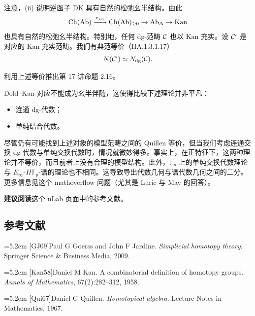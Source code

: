 \nitem\label{L18-B.2} 注意，(ii) 说明逆函子 $\mathrm{DK}$ 具有自然的松弛幺半结构。由此
\[
\operatorname{Ch}(\operatorname{Ab})\xrightarrow{\tau_{\ge 0}}\operatorname{Ch}(\operatorname{Ab})_{\ge 0}\to\operatorname{Ab}_{\Delta}\to\operatorname{Kan}
\]
也具有自然的松弛幺半结构。特别地，任何 dg-范畴 $\mathcal{C}$ 也以 Kan 充实。设 $\mathcal{C}'$ 是对应的 Kan 充实范畴。我们有典范等价（HA.1.3.1.17）
\[
N(\mathcal{C}')\simeq N_{\mathrm{dg}}(\mathcal{C}).
\]

\begin{exercise}\label{L18-B.3}
利用上述等价推出第 17 讲命题 2.16。
\end{exercise}

\nitem\label{L18-B.4} Dold–Kan 对应不能成为幺半伴随，这使得比较下述理论并非平凡：
\begin{itemize}[leftmargin=2.2em,itemsep=0.1em]
\item 连通 dg-代数；
\item 单纯结合代数。
\end{itemize}
尽管仍有可能找到上述对象的模型范畴之间的 Quillen 等价，但当我们考虑连通交换 dg-代数与单纯交换代数时，情况就微妙得多。事实上，在正特征下，这两种理论并不等价，而且前者上没有合理的模型结构。此外，$\mathbb{F}_{p}$ 上的单纯交换代数理论与 $E_{\infty}$-$H\mathbb{F}_{p}$-谱的理论也不相同。这导致导出代数几何与谱代数几何之间的二分。更多信息见这个 mathoverflow 问题（尤其是 Lurie 与 May 的回答）。

\nitem\label{L18-B.5} \textbf{建议阅读}\quad 这个 nLab 页面中的参考文献。

\subsection*{参考文献}
\par\noindent\hangindent=5.2em [GJ09]\hspace{0.6em}Paul G Goerss and John F Jardine. \emph{Simplicial homotopy theory}. Springer Science \& Business Media, 2009.
\par\noindent\hangindent=5.2em [Kan58]\hspace{0.6em}Daniel M Kan. A combinatorial definition of homotopy groups. \emph{Annals of Mathematics}, 67(2):282–312, 1958.
\par\noindent\hangindent=5.2em [Qui67]\hspace{0.6em}Daniel G Quillen. \emph{Homotopical algebra}. Lecture Notes in Mathematics, 1967.
